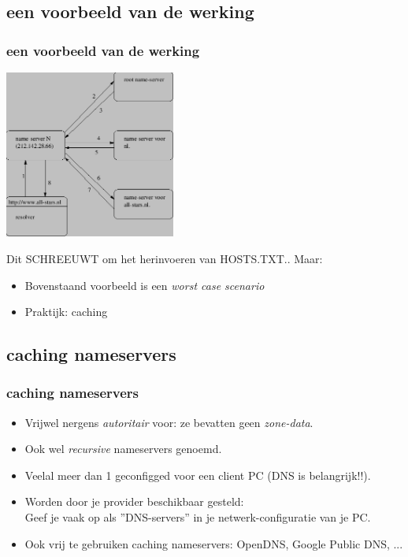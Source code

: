 \subsection{een voorbeeld van de werking}
\begin{styleframefrag}
        \frametitle{een voorbeeld van de werking}
\begin{center}
\includegraphics[width=5.6cm]{img/dns_voorbeeld.png}\\
\end{center}
\pause
Dit SCHREEUWT om het herinvoeren van HOSTS.TXT..
\pause
Maar:
\begin{itemize}
	\item[] Bovenstaand voorbeeld is een {\it worst case scenario}
	\item[] Praktijk: caching
\end{itemize}
\end{styleframefrag}

\subsection{caching nameservers}
\begin{styleframe}
        \frametitle{caching nameservers}
\begin{itemize}
	\item Vrijwel nergens {\it autoritair} voor: ze bevatten geen {\it zone-data}.
	\item Ook wel {\it recursive} nameservers genoemd.
	\item Veelal meer dan 1 geconfigged voor een client PC (DNS is belangrijk!!).
	\item Worden door je provider beschikbaar gesteld:\\
	 Geef je vaak op als ''DNS-servers'' in je netwerk-configuratie van je PC.
	\item Ook vrij te gebruiken caching nameservers: OpenDNS, Google Public DNS, ...
\end{itemize}
\end{styleframe}

